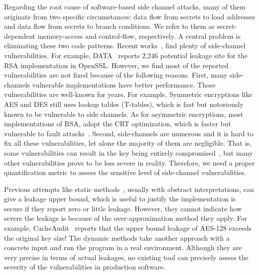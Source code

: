 Regarding the root cause of software-based side channel attacks, many of them originate
from two specific circumstances: data flow from secrets to load
addresses and data flow from secrets to branch conditions. We refer to them as
 secret-dependent memory-access and control-flow, respectively. A
central problem is eliminating these two code patterns. 
Recent
works~\cite{203878,217537,Wichelmann:2018:MFF:3274694.3274741,Brotzman19Casym,236338,182946},
find plenty of side-channel vulnerabilities. For example,
DATA~\cite{217537} reports 2,246 potential leakage site for the RSA
implementation in OpenSSL\@. 
However, we find most of the reported vulnerabilities are not fixed because
of the following reasons.
First, many side-channels vulnerable implementations have better performance.
Those vulnerabilities are well-known for years. For example,
Symmetric encryptions like AES and DES still uses lookup tables (T-tables), which
is fast but notoriously known to be vulnerable to side channels.
As for asymmetric encryptions, most implementations of RSA, adopt the CRT optimization,
which is faster but vulnerable to fault attacks~\cite{aumuller2002fault}.
Second, side-channels are numerous and it is hard to fix all these vulnerabilities,
let alone the majority of them are negligible. 
That is, some vulnerabilities can result in the key being 
entirely compromised~\cite{184415, aumuller2002fault}, but many other vulnerabilities prove to be less
severe in reality. Therefore, we need a proper quantification metric to 
assess the sensitive level of side-channel vulnerabilities.

Previous attempts like static methods~\cite{182946,5207642}, usually with
abstract interpretations, can give a leakage upper bound, which is useful to
justify the implementation is secure if they report zero or little leakage.
However, they cannot indicate how severe the leakage is because of the
over-approximation method they apply. For example, CacheAudit~\cite{182946} reports that the upper
bound leakage of AES-128 exceeds the original key size! The dynamic methods take
another approach with a concrete input and run the program in a real
environment. Although they are very precise in terms of actual leakages, no
existing tool can precisely assess the severity of the vulnerabilities in production
software. 

